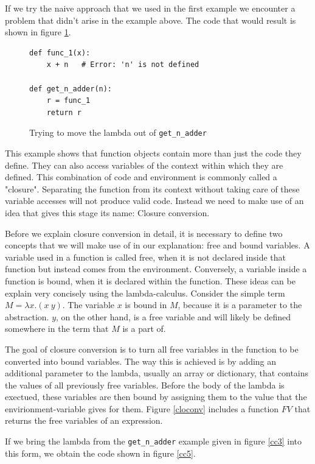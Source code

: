 \documentclass[11pt]{report}
\begin{document}
If we try the naive approach that we used in the first example we encounter a problem that didn't arise in the example above. The code that would result is shown in figure \ref{cc4}.

\begin{figure}[ht]
\begin{lstlisting}
def func_1(x):
    x + n   # Error: 'n' is not defined
    
def get_n_adder(n):
    r = func_1
    return r
\end{lstlisting}
\caption{Trying to move the lambda out of \texttt{get_n_adder}}
\label{cc4}
\end{figure}

This example shows that function objects contain more than just the code they define. They can also access variables of the context within which they are defined. This combination of code and environment is commonly called a "closure". Separating the function from its context without taking care of these variable accesses will not produce valid code. Instead we need to make use of an idea that gives this stage its name: Closure conversion.

Before we explain closure conversion in detail, it is necessary to define two concepts that we will make use of in our explanation: free and bound variables. A variable used in a function is called free, when it is not declared inside that function but instead comes from the environment. Conversely, a variable inside a function is bound, when it is declared within the function. These ideas can be explain very concisely using the lambda-calculus. Consider the simple term $M = \lambda x.(x\ y)$. The variable $x$ is bound in $M$, because it is a parameter to the abstraction. $y$, on the other hand, is a free variable and will likely be defined somewhere in the term that $M$ is a part of.

The goal of closure conversion is to turn all free variables in the function to be converted into bound variables. The way this is achieved is by adding an additional parameter to the lambda, usually an array or dictionary, that contains the values of all previously free variables. Before the body of the lambda is exectued, these variables are then bound by assigning them to the value that the envirionment-variable gives for them. Figure \ref{cloconv} includes a function $FV$ that returns the free variables of an expression.

If we bring the lambda from the \texttt{get_n_adder} example given in figure \ref{cc3} into this form, we obtain the code shown in figure \ref{cc5}.
\end{document}
